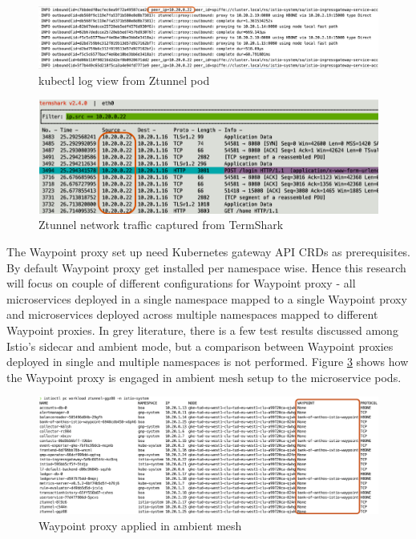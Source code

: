 \begin{figure}[ht!]
    \centering
    \includegraphics[width=1.0\linewidth]{resources/ztunnel-log.png}
    \caption{kubectl log view from Ztunnel pod}
    \label{method:ztunnelLogView}
\end{figure}

\begin{figure}[ht!]
    \centering
    \includegraphics[width=1.0\linewidth]{resources/ztunnel-network-trace.png}
    \caption{Ztunnel network traffic captured from TermShark}
    \label{method:ztunnelTraceView}
\end{figure}

The Waypoint proxy set up need Kubernetes gateway API CRDs as prerequisites. By default Waypoint proxy get installed per namespace wise. Hence this research will focus on couple of different configurations for Waypoint proxy - all microservices deployed in a single namespace mapped to a single Waypoint proxy and microservices deployed across multiple namespaces mapped to different Waypoint proxies. In grey literature, there is a few test results discussed among Istio's sidecar and ambient mode, but a comparison between Waypoint proxies deployed in single and multiple namespaces is not performed. Figure \ref{method:waypointAppliedView} shows how the Waypoint proxy is engaged in ambient mesh setup to the microservice pods.

\begin{figure}[ht!]
    \centering
    \includegraphics[width=1.0\linewidth]{resources/waypoint-applied.png}
    \caption{Waypoint proxy applied in ambient mesh}
    \label{method:waypointAppliedView}
\end{figure}

